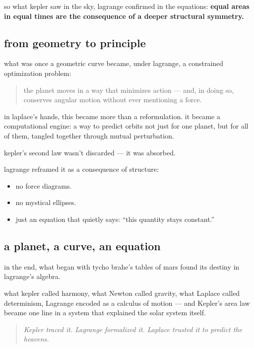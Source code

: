 so what kepler saw in the sky, lagrange confirmed in the equations:  
\textbf{equal areas in equal times are the consequence of a deeper structural symmetry.}

\subsection{from geometry to principle}

what was once a geometric curve became, under lagrange, a constrained optimization problem:
\begin{quote}
    the planet moves in a way that minimizes action —  
    and, in doing so, conserves angular motion without ever mentioning a force.
\end{quote}

in laplace’s hands, this became more than a reformulation. it became a computational engine:  
a way to predict orbits not just for one planet, but for all of them, tangled together through mutual perturbation.

\begin{tcolorbox}[colback=blue!5!white, colframe=blue!60!black, title={kepler, rediscovered}]
kepler’s second law wasn’t discarded — it was absorbed.

lagrange reframed it as a consequence of structure:  
\begin{itemize}
    \item no force diagrams.
    \item no mystical ellipses.
    \item just an equation that quietly says: “this quantity stays constant.”
\end{itemize}
\end{tcolorbox}

\subsection{a planet, a curve, an equation}

in the end, what began with tycho brahe’s tables of mars found its destiny in lagrange’s algebra.

what kepler called harmony,  
what Newton called gravity,  
what Laplace called determinism,  
Lagrange encoded as a calculus of motion — and Kepler’s area law became one line in a system that explained the solar system itself.

\begin{quote}
    \textit{Kepler traced it.  
    Lagrange formalized it.  
    Laplace trusted it to predict the heavens.}
\end{quote}
